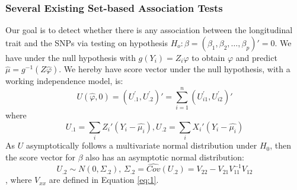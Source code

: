 \documentclass[12pt]{article}
\begin{document}
\subsubsection{Several Existing Set-based Association Tests}
Our goal is to detect whether there is any association between the longitudinal trait and the SNPs via testing on hypothesis $H_{o}:\beta=(\beta_{1},\beta_{2},\ldots,\beta_{p})'=0$. We have under the null hypothesis with $g(Y_i)=Z_i\varphi$ to obtain $\varphi$ and predict $\hat{\mu}=g^{-1}(Z\hat{\varphi})$. We hereby have score vector under the null hypothesis, with a working independence model, is:
$$U(\hat{\varphi},0)=(U_{.1}^{'}, U_{.2}^{'})'=\sum_{i=1}^{n}(U_{i1}^{'},U_{i2}^{'})'$$
where
$$U_{.1}=\sum_{i}Z_{i}'(Y_{i}-\hat{\mu_{i}}), U_{.2}=\sum_{i}X_{i}'(Y_{i}-\hat{\mu_{i}})$$ 
As $U$ asymptotically follows a multivariate normal distribution under $H_{0}$, then the score vector for $\beta$ also has an asymptotic normal distribution:\\
$$
U_{.2}\sim N(0,\Sigma_{.2}),\,\Sigma_{.2}= \widehat{Cov} (U_{.2}) = V_{22} - V_{21} V_{11}^{-1} V_{12}
$$, where $V_{xx}$ are defined in Equation \ref{eq:1}.
\end{document}
